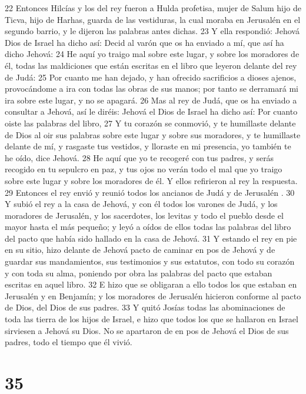 22 Entonces Hilcías y los del rey fueron a Hulda profetisa, mujer de Salum hijo de Ticva, hijo de Harhas, guarda de las vestiduras, la cual moraba en Jerusalén  en el segundo barrio, y le dijeron las palabras antes dichas.
23 Y ella respondió: Jehová Dios de Israel ha dicho así: Decid al varón que os ha enviado a mí, que así ha dicho Jehová:
24 He aquí yo traigo mal sobre este lugar, y sobre los moradores de él, todas las maldiciones que están escritas en el libro que leyeron delante del rey de Judá:
25 Por cuanto me han dejado, y han ofrecido sacrificios a dioses ajenos, provocándome a ira con todas las obras de sus manos; por tanto se derramará mi ira sobre este lugar, y no se apagará.
26 Mas al rey de Judá, que os ha enviado a consultar a Jehová, así le diréis: Jehová el Dios de Israel ha dicho así: Por cuanto oiste las palabras del libro,
27 Y tu corazón se conmovió, y te humillaste delante de Dios al oir sus palabras sobre este lugar y sobre sus moradores, y te humillaste delante de mí, y rasgaste tus vestidos, y lloraste en mi presencia, yo también te he oído, dice Jehová.
28 He aquí que yo te recogeré con tus padres, y serás recogido en tu sepulcro en paz, y tus ojos no verán todo el mal que yo traigo sobre este lugar y sobre los moradores de él. Y ellos refirieron al rey la respuesta.
29 Entonces el rey envió y reunió todos los ancianos de Judá y de Jerusalén .
30 Y subió el rey a la casa de Jehová, y con él todos los varones de Judá, y los moradores de Jerusalén, y los sacerdotes, los levitas y todo el pueblo desde el mayor hasta el más pequeño; y leyó a oídos de ellos todas las palabras del libro del pacto que había sido hallado en la casa de Jehová.
31 Y estando el rey en pie en su sitio, hizo delante de Jehová pacto de caminar en pos de Jehová y de guardar sus mandamientos, sus testimonios y sus estatutos, con todo su corazón y con toda su alma, poniendo por obra las palabras del pacto que estaban escritas en aquel libro.
32 E hizo que se obligaran a ello todos los que estaban en Jerusalén  y en Benjamín; y los moradores de Jerusalén  hicieron conforme al pacto de Dios, del Dios de sus padres.
33 Y quitó Josías todas las abominaciones de toda las tierra de los hijos de Israel, e hizo que todos los que se hallaron en Israel sirviesen a Jehová su Dios. No se apartaron de en pos de Jehová el Dios de sus padres, todo el tiempo que él vivió.

\chapter{35}

